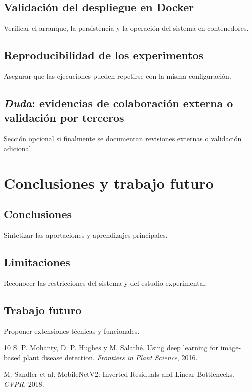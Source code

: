 \documentclass[11pt,spanish,listoffigures,listoftables]{tfgetsinf}
\begin{document}
\section{Validación del despliegue en Docker}
Verificar el arranque, la persistencia y la operación del sistema en contenedores.

\section{Reproducibilidad de los experimentos}
Asegurar que las ejecuciones pueden repetirse con la misma configuración.

\section{\textit{Duda}: evidencias de colaboración externa o validación por terceros}
Sección opcional si finalmente se documentan revisiones externas o validación adicional.

\chapter{Conclusiones y trabajo futuro}
\section{Conclusiones}
Sintetizar las aportaciones y aprendizajes principales.

\section{Limitaciones}
Reconocer las restricciones del sistema y del estudio experimental.

\section{Trabajo futuro}
Proponer extensiones técnicas y funcionales.

\backmatter
\begin{thebibliography}{10}
S. P. Mohanty, D. P. Hughes y M. Salathé.
\newblock Using deep learning for image-based plant disease detection.
\newblock \textit{Frontiers in Plant Science}, 2016.

M. Sandler et al.
\newblock MobileNetV2: Inverted Residuals and Linear Bottlenecks.
\newblock \textit{CVPR}, 2018.

\end{thebibliography}
\cleardoublepage
\end{document}
